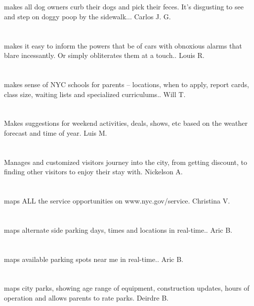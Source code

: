 \section{}makes all dog owners curb their dogs and pick their feces. It's disgusting to see and step on doggy poop by the sidewalk... Carlos J.  G.
\section{}makes it easy to inform the powers that be of cars with obnoxious alarms that blare incessantly. Or simply obliterates them at a touch.. Louis R.
\section{}makes sense of NYC schools for parents -- locations,  when to apply,  report cards,  class size,  waiting lists and specialized curriculums.. Will T.
\section{}Makes suggestions for weekend activities,  deals,  shows,  etc based on the weather forecast and time of year. Luis M.
\section{}Manages and customized visitors journey into the city, from getting discount,  to finding other visitors to enjoy their stay with. Nickelson A.
\section{}maps ALL the service opportunities on www.nyc.gov/service. Christina  V.
\section{}maps alternate side parking days,  times and locations in real-time.. Aric B.
\section{}maps available parking spots near me in real-time.. Aric B.
\section{}maps city parks,  showing age range of equipment,  construction updates,  hours of operation and allows parents to rate parks. Deirdre B.
